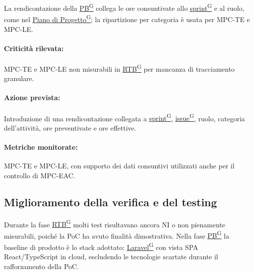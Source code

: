 \documentclass[a4paper,12pt]{article}
\providecommand{\glslink}[2]{\href{https://alittlebyte-19.github.io/Documentazione/glossario.html\#gls-#1}{\underline{#2}\textsuperscript{\scriptsize G}}}
\begin{document}
La rendicontazione della \glslink{pb-product-baseline}{PB} collega le ore consuntivate allo \glslink{sprint}{sprint} e al ruolo, come nel \glslink{piano-di-progetto}{Piano di Progetto}; la ripartizione per categoria è usata per MPC-TE e MPC-LE.

\paragraph*{Criticità rilevata:} MPC-TE e MPC-LE non misurabili in \glslink{rtb-requirements-and-technology-baseline}{RTB} per mancanza di tracciamento granulare.

\paragraph*{Azione prevista:} Introduzione di una rendicontazione collegata a \glslink{sprint}{sprint}, \glslink{issue}{issue}, ruolo, categoria dell'attività, ore preventivate e ore effettive.

\paragraph*{Metriche monitorate:} MPC-TE e MPC-LE, con supporto dei dati consuntivi utilizzati anche per il controllo di MPC-EAC.

\subsection{Miglioramento della verifica e del testing}

Durante la fase \glslink{rtb-requirements-and-technology-baseline}{RTB} molti test risultavano ancora NI o non pienamente misurabili, poiché la PoC ha avuto finalità dimostrativa. Nella fase \glslink{pb-product-baseline}{PB} la baseline di prodotto è lo stack adottato: \glslink{laravel}{Laravel} con vista SPA React/TypeScript in cloud, escludendo le tecnologie scartate durante il rafforzamento della PoC.
\end{document}
